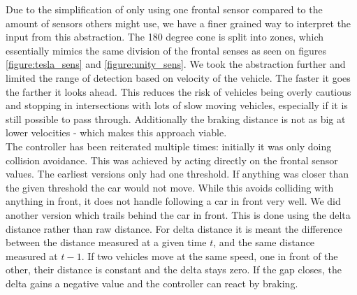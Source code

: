 Due to the simplification of only using one frontal sensor compared to the amount of sensors others might use, we have a finer grained way to interpret the input from this abstraction.
The 180 degree cone is split into zones, which essentially mimics the same division of the frontal senses as seen on figures \ref{figure:tesla_sens} and \ref{figure:unity_sens}.
We took the abstraction further and limited the range of detection based on velocity of the vehicle. The faster it goes the farther it looks ahead.
This reduces the risk of vehicles being overly cautious and stopping in intersections with lots of slow moving vehicles, especially if it is still possible to pass through.
Additionally the braking distance is not as big at lower velocities - which makes this approach viable.\\

The controller has been reiterated multiple times: initially it was only doing collision avoidance.
This was achieved by acting directly on the frontal sensor values.
The earliest versions only had one threshold. If anything was closer than the given threshold the car would not move.
While this avoids colliding with anything in front, it does not handle following a car in front very well.
We did another version which trails behind the car in front.
This is done using the delta distance rather than raw distance.
For delta distance it is meant the difference between the distance measured at a given time $t$, and the same distance measured at $t-1$. 
If two vehicles move at the same speed, one in front of the other, their distance is constant and the delta stays zero.
If the gap closes, the delta gains a negative value and the controller can react by braking. 
